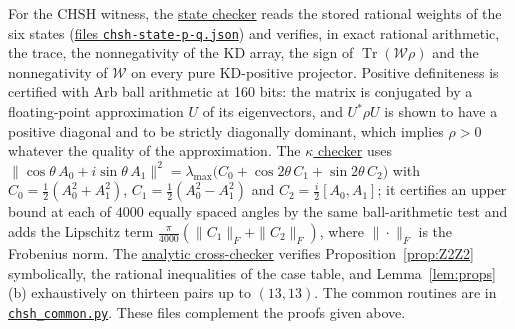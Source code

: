 \documentclass[11pt,a4paper]{article}
\theoremstyle{definition}
\theoremstyle{plain}
\DeclareMathOperator{\Tr}{Tr}
\newcommand{\Wc}{\mathcal W}
\begin{document}
For the CHSH witness, the
\href{https://github.com/jpbruneton/open_quantum_problems/blob/main/research/entries/kd-z3x3/checks/certify_chsh_states.py}{state checker}
reads the stored rational weights of the six states
(\href{https://github.com/jpbruneton/open_quantum_problems/tree/main/research/entries/kd-z3x3/data}{files \texttt{chsh-state-p-q.json}})
and verifies, in exact rational arithmetic, the trace, the nonnegativity of
the KD array, the sign of $\Tr(\Wc\rho)$ and the nonnegativity of $\Wc$ on
every pure KD-positive projector. Positive definiteness is certified with Arb
ball arithmetic at 160 bits: the matrix is conjugated by a floating-point
approximation $U$ of its eigenvectors, and $U^*\rho U$ is shown to have a
positive diagonal and to be strictly diagonally dominant, which implies
$\rho>0$ whatever the quality of the approximation. The
\href{https://github.com/jpbruneton/open_quantum_problems/blob/main/research/entries/kd-z3x3/checks/certify_kappa.py}{$\kappa$ checker}
uses $\|\cos\theta\,A_0+i\sin\theta\,A_1\|^2=\lambda_{\max}\bigl(C_0+\cos2\theta\,
C_1+\sin2\theta\,C_2\bigr)$ with $C_0=\frac12(A_0^2+A_1^2)$,
$C_1=\frac12(A_0^2-A_1^2)$ and $C_2=\frac i2[A_0,A_1]$; it certifies an upper
bound at each of $4000$ equally spaced angles by the same ball-arithmetic
test and adds the Lipschitz term $\frac{\pi}{4000}(\|C_1\|_F+\|C_2\|_F)$,
where $\|\cdot\|_F$ is the Frobenius norm. The
\href{https://github.com/jpbruneton/open_quantum_problems/blob/main/research/entries/kd-z3x3/checks/check_chsh_analytic.py}{analytic cross-checker}
verifies Proposition~\ref{prop:Z2Z2} symbolically, the rational inequalities
of the case table, and Lemma~\ref{lem:props}(b) exhaustively on thirteen
pairs up to $(13,13)$. The common routines are in
\href{https://github.com/jpbruneton/open_quantum_problems/blob/main/research/entries/kd-z3x3/checks/chsh_common.py}{\texttt{chsh\_common.py}}.
These files complement the proofs given above.
\end{document}
